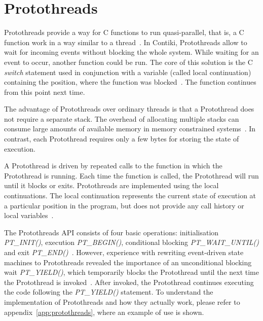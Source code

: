 
\section{Protothreads}\label{sec:contiki-protothreads}
Protothreads provide a way for C functions to run quasi-parallel,
that is, a C function work in a way similar to a thread~\cite{paper-protothreads}.
In Contiki, Protothreads allow to wait for incoming events without blocking the whole system.
While waiting for an event to occur, another function could be run.
The core of this solution is the C {\it switch} statement used in conjunction with a variable (called local continuation)
containing the position, where the function was blocked~\cite{paper-protothreads}.
The function continues from this point next time.

The advantage of Protothreads over ordinary threads is that a Protothread does not require a separate stack.
The overhead of allocating multiple stacks can consume large amounts of
available memory in memory constrained systems~\cite{paper-protothreads}.
In contrast, each Protothread requires only a few bytes for storing the state of execution.

A Protothread is driven by repeated calls to the function in which the Protothread is running.
Each time the function is called, the Protothread will run until it blocks or exits.
Protothreads are implemented using the local continuations. The local continuation represents the current state
of execution at a particular position in the program, but does not provide any call history or local variables~\cite{contiki-docs}.

The Protothreads API consists of four basic operations: initialisation {\it{PT\_INIT()}}, execution {\it{PT\_BEGIN()}},
conditional blocking {\it{PT\_WAIT\_UNTIL()}} and exit {\it{PT\_END()}}~\cite{paper-protothreads}.
However, experience with rewriting event-driven state machines to Protothreads revealed
the importance of an unconditional blocking wait {\it{PT\_YIELD()}},
which temporarily blocks the Protothread until the next time the Protothread is invoked~\cite{thesis-programming}.
After invoked, the Protothread continues executing the code following the {\it{PT\_YIELD()}} statement.
To understand the implementation of Protothreads and how they actually work,
please refer to appendix~\ref{app:protothreads}, where an example of use is shown.

